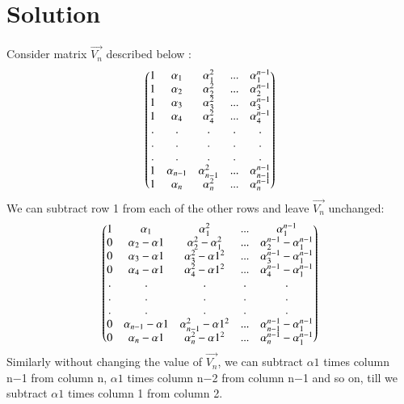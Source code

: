 \documentclass[journal,12pt,twocolumn]{IEEEtran}
\begin{document}
\section{\textbf{Solution}}
Consider matrix $\vec{V_n}$ described below :
\begin{align}
    \begin{pmatrix}1 & \alpha_1 & \alpha_1^2 & ... &\alpha_1^{n-1}\\
    1 & \alpha_2 & \alpha_2^2 & ... &\alpha_2^{n-1}\\
    1 & \alpha_3 & \alpha_3^2 & ... &\alpha_3^{n-1}\\
    1 & \alpha_4 & \alpha_4^2 & ... &\alpha_4^{n-1} \\
    . & . & . & . & . \\
    . & . & . & . & . \\
    . & . & . & . & . \\
    1 & \alpha_{n-1} & \alpha_{n-1}^2 & ... &\alpha_{n-1}^{n-1} \\
    1 & \alpha_n & \alpha_n^2 & ... &\alpha_n^{n-1}\end{pmatrix}
\end{align}
We can subtract row 1 from each of the other rows and leave $\vec{V_n}$ unchanged:
\begin{align}
    \begin{pmatrix}1 & \alpha_1 & \alpha_1^2 & ... &\alpha_1^{n-1}\\
    0 & \alpha_2-\alpha1 & \alpha_2^2-\alpha_1^2 & ... &\alpha_2^{n-1}-\alpha_1^{n-1}\\
    0 & \alpha_3-\alpha1 & \alpha_3^2-\alpha1^2 & ... &\alpha_3^{n-1}-\alpha_1^{n-1}\\
    0 & \alpha_4-\alpha1& \alpha_4^2-\alpha1^2 & ... &\alpha_4^{n-1}-\alpha_1^{n-1} \\
    . & . & . & . & . \\
    . & . & . & . & . \\
    . & . & . & . & . \\
    0 & \alpha_{n-1}-\alpha1& \alpha_{n-1}^2-\alpha1^2 & ... &\alpha_{n-1}^{n-1}-\alpha_1^{n-1} \\
    0 & \alpha_n-\alpha1& \alpha_n^2-\alpha1^2 & ... &\alpha_n^{n-1}-\alpha_1^{n-1}
    \end{pmatrix}
\end{align}
Similarly without changing the value of $\vec{V_n}$, we can subtract $\alpha1$ times column n−1 from column n, $\alpha1$ times column n−2 from column n−1 and so on, till we subtract
$\alpha1$  times column 1 from column 2.
\end{document}
